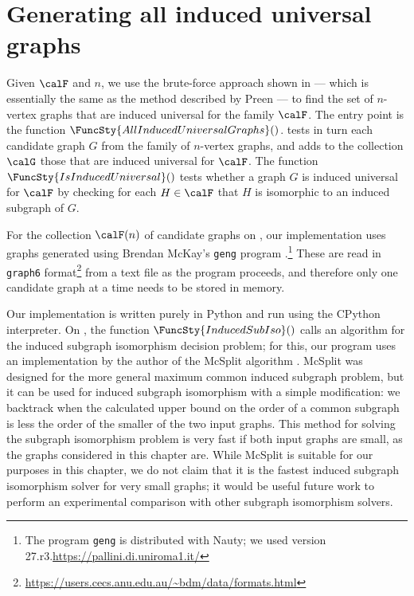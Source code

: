 \section{Generating all induced universal graphs}\label{sec:method}

Given $\calF$ and $n$,
we use the brute-force approach
shown in  --- which is essentially the same as the method
described by Preen \cite{preen_math_se} ---
to find the set of
$n$-vertex graphs that are induced universal for the family $\calF$.
The entry point is the function $\FuncSty{AllInducedUniversalGraphs}()$.
 tests in turn each candidate graph $G$ from the family
of $n$-vertex graphs, and adds to the collection $\calG$ those that are induced universal
for $\calF$.  The function $\FuncSty{IsInducedUniversal}()$ tests
whether a graph $G$ is induced universal for $\calF$ by checking for
each $H \in \calF$ that $H$ is isomorphic to an induced subgraph of $G$.

For the collection $\calF(n)$ of candidate graphs on , our
implementation uses graphs generated using Brendan McKay's \texttt{geng}
program \cite{DBLP:journals/jal/McKay98}.\footnote{The program \texttt{geng} is distributed
with Nauty; we used version 27.r3.\url{https://pallini.di.uniroma1.it/}}
These are read in \texttt{graph6}
format\footnote{\url{https://users.cecs.anu.edu.au/~bdm/data/formats.html}}
from a text file as the program proceeds, and therefore only one candidate
graph at a time needs to be stored in memory.

Our implementation is written purely in Python and run using the CPython
interpreter.
On , the function $\FuncSty{InducedSubIso}()$
calls an algorithm for the induced
subgraph isomorphism decision problem; for this,
our program uses an implementation by the author of the McSplit
algorithm \cite{DBLP:conf/ijcai/McCreeshPT17}.
McSplit was designed for
the more general maximum common induced subgraph problem,
but it can be used for induced subgraph isomorphism with a simple
modification: we backtrack when the calculated upper bound
on the order of a common subgraph is less the order of the smaller
of the two input graphs.
This method for solving
the subgraph isomorphism problem is very fast if both input graphs
are small, as the graphs considered in this chapter are.
While McSplit is suitable for our purposes in this chapter,
we do not claim that it is the fastest induced subgraph isomorphism
solver for very small graphs; it would be useful future work to perform
an experimental comparison with other subgraph isomorphism solvers.

